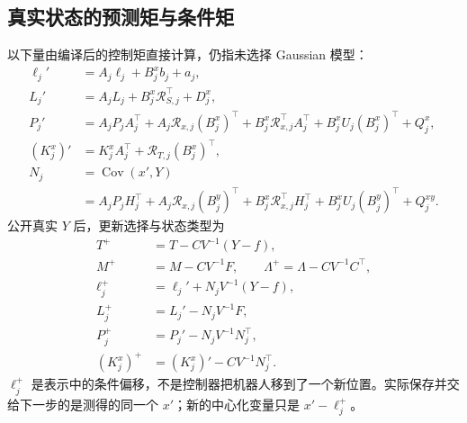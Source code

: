 \documentclass[UTF8,fontset=fandol,11pt,a4paper]{ctexart}
\DeclareMathOperator{\Cov}{Cov}\DeclareMathOperator{\im}{im}\DeclareMathOperator{\rank}{rank}
\theoremstyle{definition}\newtheorem{definition}[theorem]{定义}\newtheorem{assumption}[theorem]{条件}
\numberwithin{equation}{section}
\begin{document}
\subsection{真实状态的预测矩与条件矩}
以下量由编译后的控制矩直接计算，仍指未选择 Gaussian 模型：
\begin{align}
\ell_j'&=A_j\ell_j+B_j^xb_j+a_j,\\
L_j'&=A_jL_j+B_j^x\mathcal R_{S,j}^\top+D_j^x,\label{eq:stateLprime}\\
P_j'&=A_jP_jA_j^\top+A_j\mathcal R_{x,j}(B_j^x)^\top
+B_j^x\mathcal R_{x,j}^\top A_j^\top+B_j^xU_j(B_j^x)^\top+Q_j^x,\\
(K_j^x)'&=K_j^xA_j^\top+\mathcal R_{T,j}(B_j^x)^\top,\\
N_j&=\Cov(x',Y)\nonumber\\
&=A_jP_jH_j^\top+A_j\mathcal R_{x,j}(B_j^y)^\top
+B_j^x\mathcal R_{x,j}^\top H_j^\top+B_j^xU_j(B_j^y)^\top+Q_j^{xy}.
\label{eq:stateN}
\end{align}
公开真实 $Y$ 后，更新选择与状态类型为
\begin{align}
T^+&=T-CV^{-1}(Y-f),\nonumber\\
M^+&=M-CV^{-1}F,\qquad\Lambda^+=\Lambda-CV^{-1}C^\top,\label{eq:stateTM}\\
\ell_j^+&=\ell_j'+N_jV^{-1}(Y-f),\label{eq:ellplus}\\
L_j^+&=L_j'-N_jV^{-1}F,\label{eq:Lplus}\\
P_j^+&=P_j'-N_jV^{-1}N_j^\top,\label{eq:Pplus}\\
(K_j^x)^+&=(K_j^x)'-CV^{-1}N_j^\top.\label{eq:Kplus}
\end{align}
$\ell_j^+$ 是表示中的条件偏移，不是控制器把机器人移到了一个新位置。实际保存并交给下一步的是测得的同一个 $x'$；新的中心化变量只是 $x'-\ell_j^+$。
\end{document}
